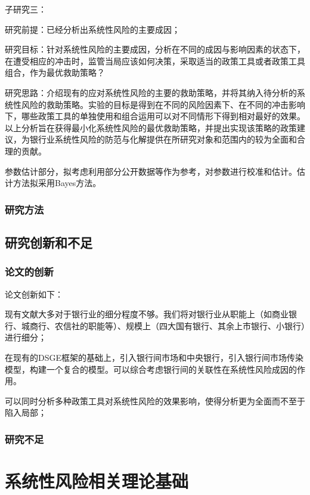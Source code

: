 子研究三：

研究前提：已经分析出系统性风险的主要成因；

研究目标：针对系统性风险的主要成因，分析在不同的成因与影响因素的状态下，在遭受相应的冲击时，监管当局应该如何决策，采取适当的政策工具或者政策工具组合，作为最优救助策略？

研究思路：介绍现有的应对系统性风险的主要的救助策略，并将其纳入待分析的系统性风险的救助策略。实验的目标是得到在不同的风险因素下、在不同的冲击影响下，哪些政策工具的单独使用和组合运用可以对不同情形下得到相对最好的效果。以上分析旨在获得最小化系统性风险的最优救助策略，并提出实现该策略的政策建议，为银行业系统性风险的防范与化解提供在所研究对象和范围内的较为全面和合理的贡献。

参数估计部分，拟考虑利用部分公开数据等作为参考，对参数进行校准和估计。估计方法拟采用Bayes方法。

\subsubsection{研究方法}

\newpage
\subsection{研究创新和不足}

\subsubsection{论文的创新}

论文创新如下：

现有文献大多对于银行业的细分程度不够。我们将对银行业从职能上（如商业银行、城商行、农信社的职能等）、规模上（四大国有银行、其余上市银行、小银行）进行细分；

在现有的DSGE框架的基础上，引入银行间市场和中央银行，引入银行间市场传染模型，构建一个复合的模型。可以综合考虑银行间的关联性在系统性风险成因的作用。

可以同时分析多种政策工具对系统性风险的效果影响，使得分析更为全面而不至于陷入局部；



\subsubsection{研究不足}

\newpage
\section{系统性风险相关理论基础}

